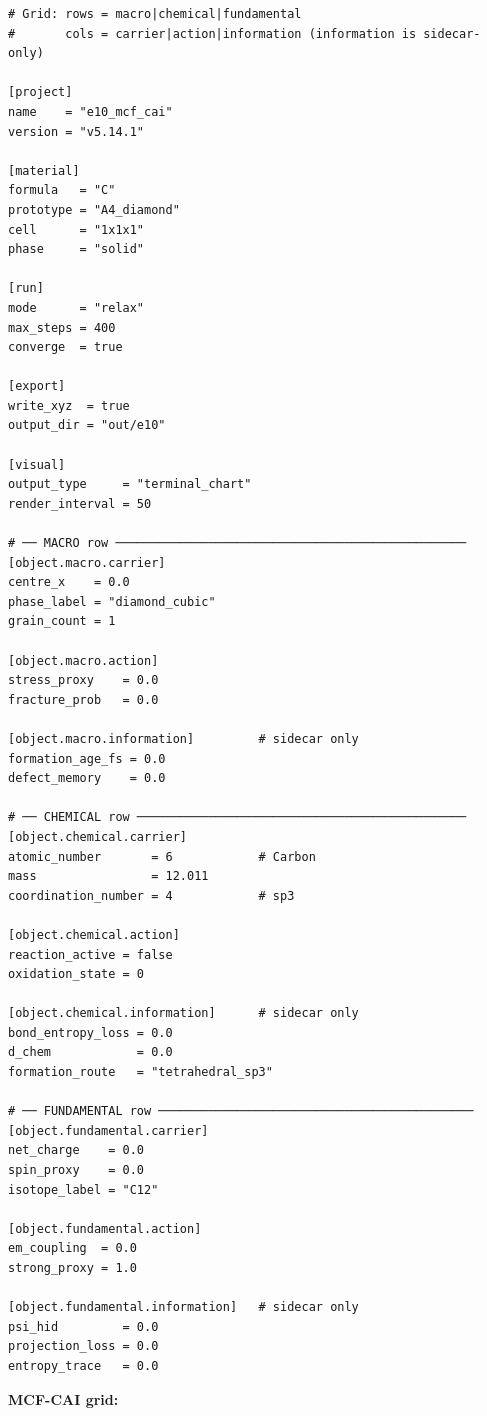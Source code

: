 \documentclass[11pt,a4paper]{article}
\begin{document}
\begin{tcolorbox}[scriptbox, scriptheader, title={e10\_mcf\_cai.vsim}]
\begin{lstlisting}[style=vsimlst]
# Grid: rows = macro|chemical|fundamental
#       cols = carrier|action|information (information is sidecar-only)

[project]
name    = "e10_mcf_cai"
version = "v5.14.1"

[material]
formula   = "C"
prototype = "A4_diamond"
cell      = "1x1x1"
phase     = "solid"

[run]
mode      = "relax"
max_steps = 400
converge  = true

[export]
write_xyz  = true
output_dir = "out/e10"

[visual]
output_type     = "terminal_chart"
render_interval = 50

# ── MACRO row ─────────────────────────────────────────────────
[object.macro.carrier]
centre_x    = 0.0
phase_label = "diamond_cubic"
grain_count = 1

[object.macro.action]
stress_proxy    = 0.0
fracture_prob   = 0.0

[object.macro.information]         # sidecar only
formation_age_fs = 0.0
defect_memory    = 0.0

# ── CHEMICAL row ──────────────────────────────────────────────
[object.chemical.carrier]
atomic_number       = 6            # Carbon
mass                = 12.011
coordination_number = 4            # sp3

[object.chemical.action]
reaction_active = false
oxidation_state = 0

[object.chemical.information]      # sidecar only
bond_entropy_loss = 0.0
d_chem            = 0.0
formation_route   = "tetrahedral_sp3"

# ── FUNDAMENTAL row ────────────────────────────────────────────
[object.fundamental.carrier]
net_charge    = 0.0
spin_proxy    = 0.0
isotope_label = "C12"

[object.fundamental.action]
em_coupling  = 0.0
strong_proxy = 1.0

[object.fundamental.information]   # sidecar only
psi_hid         = 0.0
projection_loss = 0.0
entropy_trace   = 0.0
\end{lstlisting}
\end{tcolorbox}

\noindent\textbf{MCF-CAI grid:}
\end{document}
